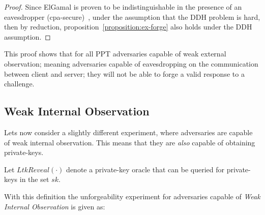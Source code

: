 \begin{proof}
Since ElGamal is proven to be indistinguishable in the presence of an eavesdropper (\acrshort{cpa}-secure)~\cite[page 402]{katz2014introduction}, under the assumption that the DDH problem is hard, then by reduction, proposition~\ref{proposition:ex-forge} also holds under the DDH assumption.
\end{proof}

This proof shows that for all PPT adversaries capable of weak external observation; meaning adversaries capable of eavesdropping on the communication between \gls{client} and \gls{server}; they will not be able to forge a valid response to a challenge.

\subsection{Weak Internal Observation}

Lets now consider a slightly different experiment, where adversaries are capable of weak internal observation. 
This means that they are \textit{also} capable of obtaining private-keys.

\begin{definition}
Let $LtkReveal(\cdot)$ denote a private-key oracle that can be queried for private-keys in the set $sk$.
\end{definition}

With this definition the unforgeability experiment for adversaries capable of \textit{Weak Internal Observation} is given as:


